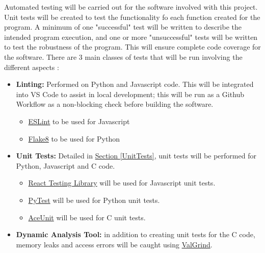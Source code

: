 \documentclass[12pt, titlepage]{article}
\begin{document}
Automated testing will be carried out for the software involved with this project. Unit tests will be created to test the functionality fo each function created for the program. A minimum of one "successful" test will be written to describe the intended program execution, and one or more "unsuccessful" tests will be written to test the robustness of the program. This will ensure complete code coverage for the software. There are 3 main classes of tests that will be run involving the different aspects \progname{}:
\begin{itemize}
  \item \textbf{Linting:} Performed on Python and Javascript code. This will be integrated into VS Code to assist in local development; this will be run as a Github Workflow as a non-blocking check before building the software.

    \begin{itemize}
      \item \href{https://marketplace.visualstudio.com/items?itemName=dbaeumer.vscode-eslint}{ESLint} to be used for Javascript
      \item \href{https://marketplace.visualstudio.com/items?itemName=ms-python.flake8}{Flake8} to be used for Python
    \end{itemize}

  \item \textbf{Unit Tests:} Detailed in \hyperref[UnitTests]{Section \ref*{UnitTests}}, unit tests will be performed for Python, Javascript and C code.
    \begin{itemize}
      \item \href{https://github.com/testing-library/react-testing-library}{React Testing Library} will be used for Javascript unit tests.
      \item \href{https://docs.pytest.org/en/7.2.x/}{PyTest} will be used for Python unit tests.
      \item \href{https://aceunit.sourceforge.net/}{AceUnit} will be used for C unit tests.
    \end{itemize}

  \item \textbf{Dynamic Analysis Tool:} in addition to creating unit tests for the C code, memory leaks and access errors will be caught using \href{https://valgrind.org/}{ValGrind}.
  
\end{itemize}
\end{document}
